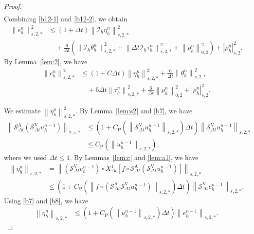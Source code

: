 \documentclass[10pt,a4paper]{amsart}
\def\norm#1#2{\left\|#2\right\|_{#1}}
\def\snorm#1#2{\left|#2\right|_{#1}}
\begin{document}
\begin{proof}
\begin{align}
  \end{align} 
  Combining \eqref{b12-1} and \eqref{b12-2}, we obtain 
  \begin{align} 
    \norm{s, 2, \ast}{e_h^n}^2
    & \leq (1 + \Delta t) \norm{s, 2, \ast}{\mathcal{I}_{h} \eta_h^n}^2 \\ & \quad + \frac{6}{\Delta t} \left(\norm{s, 2, \ast}{\mathcal{I}_{h} \theta_h^n}^2 + \norm{s, 2, \ast}{\Delta t \mathcal{I}_{h} \tau_h^n}^2 + \norm{0, 2}{\rho_h^n}^2\right)+ \snorm{s, 2}{\rho_h^n}^2. 
  \end{align} 
  By Lemma~\ref{lem:2}, we have 
  \begin{align}
    \norm{s, 2, \ast}{e_h^n}^2 & \leq (1 + C \Delta t) \norm{s, 2, \ast}{\eta_h^n}^2 + \frac{6}{\Delta t} \norm{s, 2, \ast}{\theta_h^n}^2 \\
    & \quad + 6 \Delta t \norm{s, 2, \ast}{\tau_h^n}^2 + \frac{6}{\Delta t} \norm{0, 2}{\rho_h^n}^2 + \snorm{s, 2}{\rho_h^n}^2. \label{b12}
  \end{align} 

  We estimate $ \norm{s, 2, \ast}{\eta_h^n}^2 $. By Lemma~\ref{lem:s2} and \eqref{b7}, we have 
  \begin{align} 
    \norm{2, s, \ast}{\mathcal{S}_{\Delta t}^{\mathrm{A}} (\mathcal{S}_{\Delta t}^{\mathrm{V}} u_h^{n - 1})} & \leq \left(1 + C_{\mathrm{P}} (\norm{s, 2, \ast}{\mathcal{S}_{\Delta t}^{\mathrm{V}} u_h^{n - 1}}) \Delta t\right) \norm{s, 2, \ast}{\mathcal{S}_{\Delta t}^{\mathrm{V}} u_h^{n - 1}} \\ 
    & \leq C_{\mathrm{P}} (\norm{s, 2, \ast}{u_h^{n - 1}}), \label{b8} 
  \end{align} 
  where we used $ \Delta t \leq 1 $. By Lemmas~\ref{lem:c} and \ref{lem:a1}, we have %
  \begin{align}
    \norm{s, 2, \ast}{\eta_h^n} 
    & = \norm{s, 2, \ast}{(\mathcal{S}_{\Delta t}^{\mathrm{V}} e_h^{n - 1}) \circ {X_{\Delta t}^1} [f \circ \mathcal{S}_{\Delta t}^{\mathrm{A}} (\mathcal{S}_{\Delta t}^{\mathrm{V}} u_h^{n - 1})]} \\
    & \leq \left(1 + C_{\mathrm{P}} (\norm{s, 2, \ast}{f \circ (\mathcal{S}_{\Delta t}^{\mathrm{A}} \mathcal{S}_{\Delta t}^{\mathrm{V}} u_h^{n - 1})})  \Delta t\right) \norm{s, 2, \ast}{\mathcal{S}_{\Delta t}^{\mathrm{V}} e_h^{n - 1}}. 
  \end{align} 
  Using \eqref{b7} and \eqref{b8}, we have 
  \begin{align} 
    \norm{s, 2, \ast}{\eta_h^n} & \leq \left(1 + C_{\mathrm{P}} (\norm{s, 2, \ast}{u_h^{n - 1}})  \Delta t\right) \norm{s, 2, \ast}{e_h^{n - 1}}. \label{b2} 
  \end{align} 


\end{proof}
\end{document}
